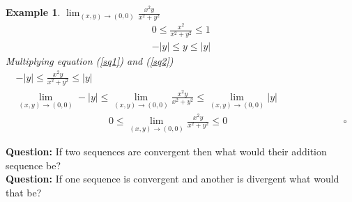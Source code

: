 \documentclass{article}
\newtheorem{example}{Example}[section]
\newcommand{\vs}{\vspace}
\begin{document}
\begin{example}
    $\displaystyle\lim_{(x,y)\to(0,0)}\frac{x^2y}{x^2+y^2}$
    \begin{gather}
        0\leq \frac{x^2}{x^2+y^2} \leq 1 \label{sq1}\\
        -|y|\leq y\leq |y| \label{sq2}
    \end{gather}
    Multiplying equation (\ref{sq1}) and (\ref{sq2})\\
    \begin{gather*}
        -|y|\leq \frac{x^2y}{x^2+y^2}\leq |y|\\
        \displaystyle\lim_{(x,y)\to(0,0)}-|y|\leq \displaystyle\lim_{(x,y)\to(0,0)}\frac{x^2y}{x^2+y^2}\leq \displaystyle\lim_{(x,y)\to(0,0)}|y|\\
        \hspace{4cm}0\leq\displaystyle\lim_{(x,y)\to(0,0)}\frac{x^2y}{x^2+y^2}\leq 0  \hspace{5cm} \square
    \end{gather*}
\end{example}\vs{0.75cm}
\textbf{Question:} If two sequences are convergent then what would their addition sequence be?\\
\textbf{Question:} If one sequence is convergent and another is divergent what would that be?
\end{document}
